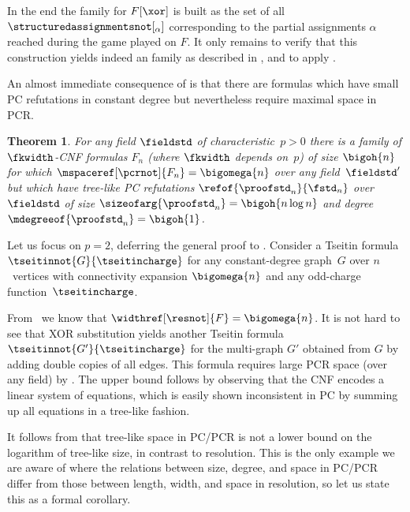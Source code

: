 \documentclass[11pt]{article}
\numberwithin{equation}{section}
\newtheorem{theorem}{Theorem}[section]
\theoremstyle{definition}
\theoremstyle{plain}
\begin{document}
\begin{ourproof}[sketch]
  In the end the \kextendible family for $F[\xor]$ is built as the set
  of all $\structuredassignmentsnot[_\alpha]$ corresponding to the partial
  assignments $\alpha$ reached during the game played on $F$.
  It only remains to verify that this construction yields indeed an
  \kextendibleNok family as described in ,
  and to apply .
\end{ourproof}

\label{sec:overview-separation}

An almost immediate consequence of  is that
there are formulas which have small PC refutations in constant
degree but nevertheless require maximal space in PCR.

\begin{theorem}
  \label{thm:separation}
%
  For any field $\fieldstd$
  of characteristic~$p>0$
  there is a family of
  \mbox{$\fkwidth$-CNF} formulas
  $F_n$
  (where $\fkwidth$ depends on~$p$)
  of size $\bigoh{n}$
  for which
%
  $\mspaceref[\pcrnot]{F_{n}}=\bigomega{n}$
  over any field~$\fieldstd'$ %
  but  which have tree-like PC refutations
  $\refof{\proofstd_n}{\fstd_n}$ 
  over~$\fieldstd$
  of size
  $\sizeofarg{\proofstd_n}=\bigoh{n\log n}$
  and degree
  $\mdegreeof{\proofstd_n}=\bigoh{1}$.
\end{theorem}


\begin{ourproof}[sketch]
  Let us focus on 
  $p=2$, deferring the general proof to  
   .
  Consider a Tseitin formula $\tseitinnot{G}{\tseitincharge}$ 
  for any constant-degree graph~$G$ over $n$~vertices
  with connectivity expansion $\bigomega{n}$
  and any odd-charge function~$\tseitincharge$.
  
  From~\cite{BW01ShortProofs}
  we know that
  $\widthref[\resnot]{F}=\bigomega{n}$.
  It is not hard to see that XOR substitution yields
  another Tseitin formula
  $\tseitinnot{G'}{\tseitincharge}$ 
  for the multi-graph $G'$ obtained from $G$ 
  by adding double copies of all edges.
  This formula requires large PCR space (over any field)
  by .
  The upper bound follows by observing that the CNF encodes a linear
  system of equations, which is easily shown inconsistent in PC by summing
  up all equations in a tree-like fashion.
\end{ourproof}

It follows from  that
tree-like space in PC/PCR is not %
a lower bound on the logarithm of %
tree-like size, in contrast to resolution. 
This is the only example we are aware of where the relations between
size, degree, and space in PC/PCR differ from those between length,
width, and space in resolution, so let us state this as a formal
corollary.
\end{document}
